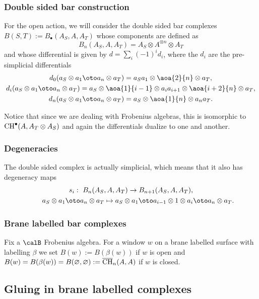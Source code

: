 \subsubsection{Double sided bar construction}
For the open action,
we will consider the double sided bar complexes
$B(S,T):=B_{\bullet}(A_S,A,A_T)$
whose components are def\/ined as
\[
B_n(A_S,A,A_T)=A_S\otimes A^{\otimes n}\otimes A_T
\]
and whose dif\/ferential is given by $d=\sum_i (-1)^i d_i$, where the
$d_i$ are the pre-simplicial dif\/ferentials
\begin{gather*}
d_0 (a_S\otimes a_1 \oto a_n \otimes a_T) = a_Sa_1\otimes \aoa{2}{n}\otimes a_T,\\
d_i (a_S\otimes a_1 \oto a_n \otimes a_T) = a_S\otimes
\aoa{1}{i-1}\otimes a_{i}a_{i+1}\otimes
\aoa{i+2}{n} \otimes a_T,\\
d_{n} (a_S\otimes a_1 \oto a_n \otimes
a_T) = a_S\otimes\aoa{1}{n}\otimes a_n a_T.
\end{gather*}

\begin{rmk}
Notice that since we are dealing with Frobenius algebras, this is
isomorphic to  ${\rm CH}^{\bullet}(A,A_T\otimes A_S)$ and again the
dif\/ferentials dualize to one and another.
\end{rmk}

\subsubsection{Degeneracies}
The double sided complex is actually simplicial,
which means that it also has degeneracy maps
\begin{gather*}
s_i: \ B_n(A_S,A,A_T) \to B_{n+1}(A_S,A,A_T), \\
\phantom{s_i:} \ \ a_S\otimes a_1 \oto a_n \otimes a_T \mapsto a_S\otimes a_1 \oto
a_{i-1}\otimes  1 \otimes a_i \oto a_n \otimes a_T.
\end{gather*}

\subsubsection{Brane labelled  bar complexes}

Fix a $\calB$ Frobenius algebra. For a window $w$ on a brane
labelled surface with labelling $\beta$ we set $B(w):=B(\beta (w))$
if $w$ is open and
$B(w)=B(\beta(w))=B(\varnothing,\varnothing):=\overline{\rm CH}_n(A,A)$ if $w$ is
closed.

\subsection{Gluing in brane labelled complexes}

